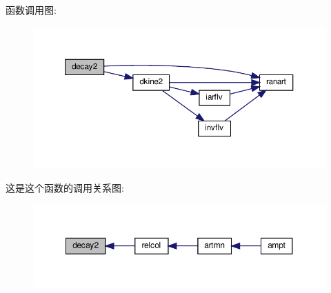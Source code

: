 函数调用图\+:
\nopagebreak
\begin{figure}[H]
\begin{center}
\leavevmode
\includegraphics[width=350pt]{decay2_8f90_ad2632dbc63a2453ed7043d6502578409_cgraph}
\end{center}
\end{figure}
这是这个函数的调用关系图\+:
\nopagebreak
\begin{figure}[H]
\begin{center}
\leavevmode
\includegraphics[width=350pt]{decay2_8f90_ad2632dbc63a2453ed7043d6502578409_icgraph}
\end{center}
\end{figure}
